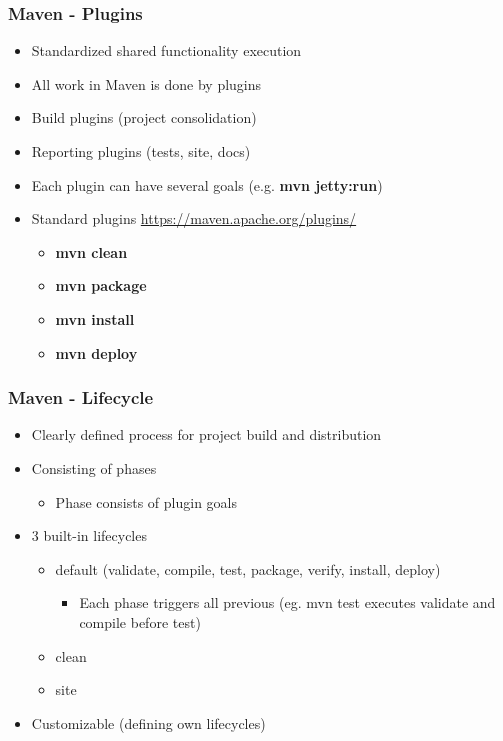 \begin{frame}
\frametitle{Maven - Plugins}
\begin{itemize}
	\item Standardized shared functionality execution
	\item All work in Maven is done by plugins
	\item Build plugins (project consolidation)
	\item Reporting plugins (tests, site, docs)
	\item Each plugin can have several goals (e.g. \textbf{mvn jetty:run})
	\item Standard plugins \url{https://maven.apache.org/plugins/}
		\begin{itemize}
		\item \textbf{mvn clean}
		\item \textbf{mvn package}
  		\item \textbf{mvn install}
  		\item \textbf{mvn deploy}
		\end{itemize}	
\end{itemize}
\end{frame}

\begin{frame}
\frametitle{Maven - Lifecycle}
\begin{itemize}
	\item Clearly defined process for project build and distribution
	\item Consisting of phases
		\begin{itemize}
		\item Phase consists of plugin goals
		\end{itemize}
	\item 3 built-in lifecycles
		\begin{itemize}
		\item default (validate, compile, test, package, verify, install, deploy)
			\begin{itemize}
			\item Each phase triggers all previous (eg. mvn test executes validate and compile before test)
			\end{itemize}
		\item clean
		\item site
		\end{itemize}
	\item Customizable (defining own lifecycles)
\end{itemize}
\end{frame}


